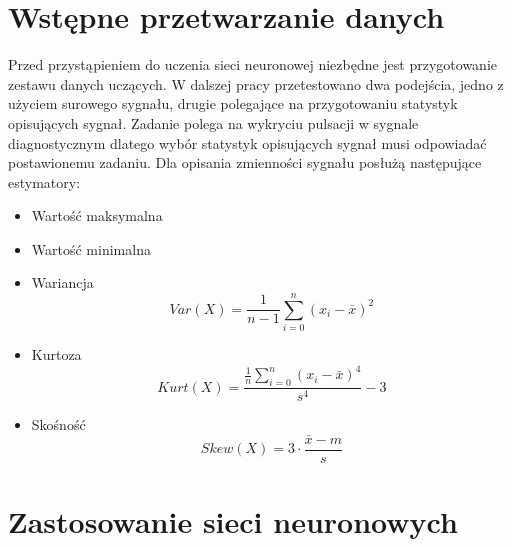 \documentclass[inzynierska]{pwr_wmat_praca_dyplomowa}
\theoremstyle{plain}
\numberwithin{theorem}{chapter}
\theoremstyle{definition}
\numberwithin{theorem}{chapter}
\begin{document}
\section{Wstępne przetwarzanie danych}
Przed przystąpieniem do uczenia sieci neuronowej niezbędne jest przygotowanie zestawu danych uczących. W dalszej pracy przetestowano dwa podejścia, jedno z użyciem surowego sygnału, drugie polegające na przygotowaniu statystyk opisujących sygnał. Zadanie polega na wykryciu pulsacji w sygnale diagnostycznym dlatego wybór statystyk opisujących sygnał musi odpowiadać postawionemu zadaniu. Dla opisania zmienności sygnału posłużą następujące estymatory:
\begin{itemize}
	\item Wartość maksymalna
	\item Wartość minimalna
	\item Wariancja
	\begin{equation}
	Var (X) = \frac{1}{n-1} \sum_{i=0}^{n} \left(x_{i} - \bar{x}\right)^{2}
	\end{equation}
	\item Kurtoza
	\begin{equation}
	Kurt (X) = \frac{\frac{1}{n} \sum_{i=0}^{n}\left(x_{i} - \bar{x}\right)^{4}}{s^{4}} - 3
	\end{equation}
	\item Skośność
	\begin{equation}
	Skew (X) = 3 \cdot \frac{\bar{x} - m}{s}
	\end{equation}
\end{itemize}



\section{Zastosowanie sieci neuronowych}
\end{document}
